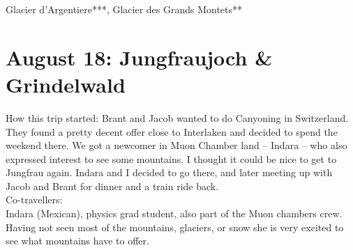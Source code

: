 Glacier d'Argentiere***, Glacier des Grands Montets**

\section{August 18: Jungfraujoch \& Grindelwald}
\label{Jsungfrau2012}

How this trip started: Brant and Jacob wanted to do Canyoning in Switzerland. They found a pretty decent offer close to Interlaken and decided to spend the weekend there. We got a newcomer in Muon Chamber land -- Indara -- who also expressed interest to see some mountains. I thought it could be nice to get to Jungfrau again. Indara and I decided to go there, and later meeting up with Jacob and Brant for dinner and a train ride back.\\

Co-travellers:\\
Indara (Mexican), physics grad student, also part of the Muon chambers crew. Having not seen most of the mountains, glaciers, or snow she is very excited to see what mountains have to offer.\\

